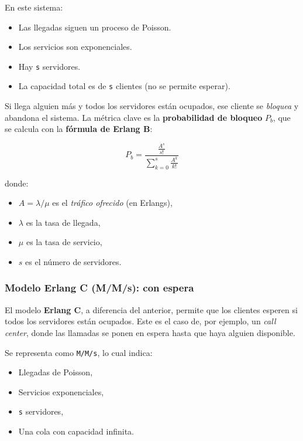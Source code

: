 \documentclass{article}
\begin{document}
En este sistema:

\begin{itemize}
    \item Las llegadas siguen un proceso de Poisson.
    \item Los servicios son exponenciales.
    \item Hay \texttt{s} servidores.
    \item La capacidad total es de \texttt{s} clientes (no se permite esperar).
\end{itemize}

Si llega alguien más y todos los servidores están ocupados, ese cliente se \textit{bloquea} y abandona el sistema. La métrica clave es la \textbf{probabilidad de bloqueo} \( P_b \), que se calcula con la \textbf{fórmula de Erlang B}:

\begin{equation}
P_b = \frac{\frac{A^s}{s!}}{\sum_{k=0}^{s} \frac{A^k}{k!}}
\end{equation}

donde:

\begin{itemize}
    \item \( A = \lambda / \mu \) es el \textit{tráfico ofrecido} (en Erlangs),
    \item \( \lambda \) es la tasa de llegada,
    \item \( \mu \) es la tasa de servicio,
    \item \( s \) es el número de servidores.
\end{itemize}

\subsubsection*{Modelo Erlang C (M/M/s): con espera}

El modelo \textbf{Erlang C}, a diferencia del anterior, permite que los clientes esperen si todos los servidores están ocupados. Este es el caso de, por ejemplo, un \textit{call center}, donde las llamadas se ponen en espera hasta que haya alguien disponible.

Se representa como \texttt{M/M/s}, lo cual indica:

\begin{itemize}
    \item Llegadas de Poisson,
    \item Servicios exponenciales,
    \item \texttt{s} servidores,
    \item Una cola con capacidad infinita.
\end{itemize}
\end{document}

